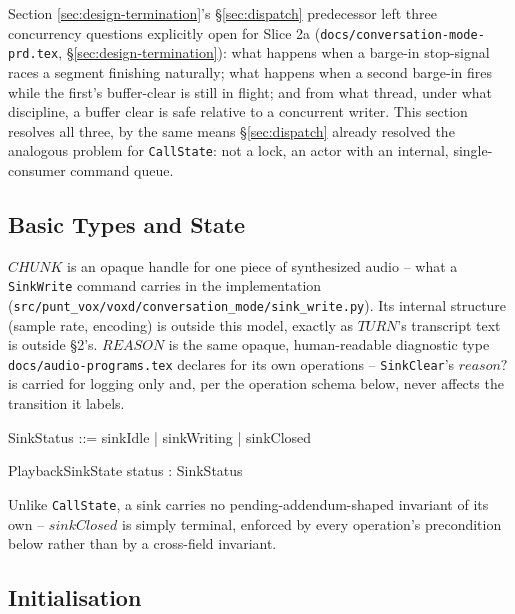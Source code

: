 \documentclass[a4paper,10pt,fleqn]{article}
\begin{document}
Section \ref{sec:design-termination}'s \S\ref{sec:dispatch} predecessor left
three concurrency questions explicitly open for Slice 2a
(\texttt{docs/conversation-mode-prd.tex}, \S\ref{sec:design-termination}):
what happens when a barge-in stop-signal races a segment finishing
naturally; what happens when a second barge-in fires while the first's
buffer-clear is still in flight; and from what thread, under what
discipline, a buffer clear is safe relative to a concurrent writer. This
section resolves all three, by the same means \S\ref{sec:dispatch} already
resolved the analogous problem for \texttt{CallState}: not a lock, an actor
with an internal, single-consumer command queue.

\subsection{Basic Types and State}

\begin{zed}
\end{zed}

$CHUNK$ is an opaque handle for one piece of synthesized audio -- what a
\texttt{SinkWrite} command carries in the implementation
(\texttt{src/punt\_vox/voxd/conversation\_mode/sink\_write.py}). Its
internal structure (sample rate, encoding) is outside this model, exactly
as $TURN$'s transcript text is outside \S 2's. $REASON$ is the same
opaque, human-readable diagnostic type \texttt{docs/audio-programs.tex}
declares for its own operations -- \texttt{SinkClear}'s $reason?$ is
carried for logging only and, per the operation schema below, never
affects the transition it labels.

\begin{zed}
  SinkStatus ::= sinkIdle | sinkWriting | sinkClosed
\end{zed}

\begin{schema}{PlaybackSinkState}
  status : SinkStatus
\end{schema}

Unlike \texttt{CallState}, a sink carries no pending-addendum-shaped
invariant of its own -- $sinkClosed$ is simply terminal, enforced by every
operation's precondition below rather than by a cross-field invariant.

\subsection{Initialisation}
\end{document}

